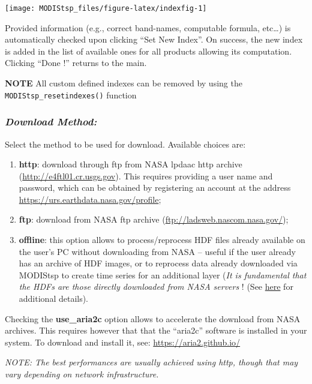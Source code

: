 \documentclass[]{article}
\begin{document}
\begin{center}\texttt{[image: MODIStsp\_files/figure-latex/indexfig-1]} \end{center}

Provided information (e.g., correct band-names, computable formula,
etc\ldots{}) is automatically checked upon clicking ``Set New Index''.
On success, the new index is added in the list of available ones for all
products allowing its computation. Clicking ``Done !'' returns to the
main.

\textbf{NOTE} All custom defined indexes can be removed by using the
\texttt{MODIStsp\_resetindexes()} function

\subsubsection{\texorpdfstring{\textbf{\emph{Download
Method:}}}{Download Method:}}\label{download-method}

Select the method to be used for download. Available choices are:

\begin{enumerate}
\def\labelenumi{\arabic{enumi}.}
\item
  \textbf{http}: download through ftp from NASA lpdaac http archive
  (\url{http://e4ftl01.cr.usgs.gov}). This requires providing a user
  name and password, which can be obtained by registering an account at
  the address \url{https://urs.earthdata.nasa.gov/profile};
\item
  \textbf{ftp}: download from NASA ftp archive
  (\url{ftp://ladsweb.nascom.nasa.gov/});
\item
  \textbf{offline}: this option allows to process/reprocess HDF files
  already available on the user's PC without downloading from NASA --
  useful if the user already has an archive of HDF images, or to
  reprocess data already downloaded via MODIStsp to create time series
  for an additional layer (\emph{It is fundamental that the HDFs are
  those directly downloaded from NASA servers} ! (See
  \href{faq.html\#working-with-already-downloaded-hdf-files}{here} for
  additional details).
\end{enumerate}

Checking the \textbf{use\_aria2c} option allows to accelerate the
download from NASA archives. This requires however that that the
``aria2c'' software is installed in your system. To download and install
it, see: \href{aria2.github.io/}{https://aria2.github.io/}

 \emph{NOTE: The best performances are usually achieved using
\emph{http}, though that may vary depending on network infrastructure.}
\end{document}
